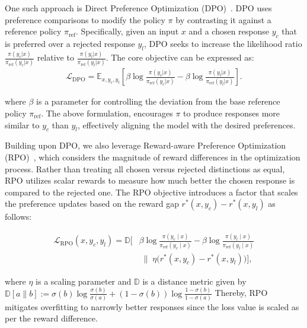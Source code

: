 One such approach is Direct Preference Optimization (DPO)~\cite{rafailov2024direct}. DPO uses preference comparisons to modify the policy $\pi$ by contrasting it against a reference policy $\pi_{\text{ref}}$. Specifically, given an input $x$ and a chosen response $y_c$ that is preferred over a rejected response $y_l$, DPO seeks to increase the likelihood ratio $\frac{\pi(y_c|x)}{\pi_{\text{ref}}(y_c|x)}$ relative to $\frac{\pi(y_l|x)}{\pi_{\text{ref}}(y_l|x)}$. The core objective can be expressed as:
\vspace{-2mm}
\begin{align*}
\mathcal{L}_{\text{DPO}} = \mathbb{E}_{x, y_c, y_l}\left[ \beta \log\frac{\pi(y_c|x)}{\pi_{\text{ref}}(y_c|x)} - \beta \log\frac{\pi(y_l|x)}{\pi_{\text{ref}}(y_l|x)} \right].
\end{align*}

where $\beta$ is a parameter for controlling the deviation from the base reference policy $\pi_{\text{ref}}$. The above formulation, encourages $\pi$ to produce responses more similar to $y_c$ than $y_l$, effectively aligning the model with the desired preferences.

Building upon DPO, we also leverage Reward-aware Preference Optimization (RPO)~\cite{adler2024nemotron}, which considers the magnitude of reward differences in the optimization process.
Rather than treating all chosen versus rejected distinctions as equal, RPO utilizes scalar rewards to measure how much better the chosen response is compared to the rejected one. The RPO objective introduces a factor that scales the preference updates based on the reward gap $r^*(x,y_c) - r^*(x,y_l)$ as follows:

\vspace{-4mm}
\begin{align*}
\mathcal{L}_{\text{RPO}}(x, y_c, y_l) 
= \mathbb{D} \Bigg[ 
    & \beta \log \frac{\pi(y_c \mid x)}{\pi_{\text{ref}}(y_c \mid x)} 
    - \beta \log \frac{\pi(y_l \mid x)}{\pi_{\text{ref}}(y_l \mid x)} \\
    & \;\Big\|\; 
    \eta \big(r^\ast(x, y_c) - r^\ast(x, y_l)\big)
\Bigg],
\end{align*}

where \(\eta\) is a scaling parameter and $\mathbb{D}$ is a distance metric given by 
$\mathbb{D}\left[a\|b\right] := \sigma(b) \log \frac{\sigma(b)}{\sigma(a)} + (1-\sigma(b)) \log \frac{1-\sigma(b)}{1-\sigma(a)}$
Thereby, RPO mitigates overfitting to narrowly better responses since the loss value is scaled as per the reward difference.

